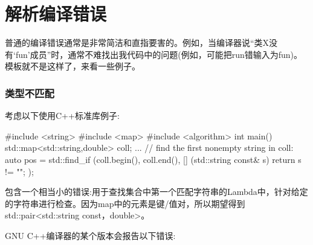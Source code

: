 \section{解析编译错误}
普通的编译错误通常是非常简洁和直指要害的。例如，当编译器说“类X没有‘fun’成员”时，通常不难找出我代码中的问题(例如，可能把run错输入为fun)。模板就不是这样了，来看一些例子。

\subsubsection{类型不匹配}

考虑以下使用C++标准库例子:

\begin{cpp}
#include <string>
#include <map>
#include <algorithm>
int main()
{
	std::map<std::string,double> coll;
	...
	// find the first nonempty string in coll:
	auto pos = std::find_if (coll.begin(), coll.end(),
	[] (std::string const& s) {
		return s != "";
	});
}
\end{cpp}

包含一个相当小的错误:用于查找集合中第一个匹配字符串的Lambda中，针对给定的字符串进行检查。因为map中的元素是键/值对，所以期望得到std::pair<std::string const，double>。

GNU C++编译器的某个版本会报告以下错误:

